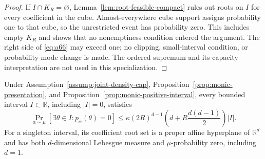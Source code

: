 \begin{proof}
If $I\cap K_R=\varnothing$, Lemma~\ref{lem:root-feasible-compact} rules out
roots on $I$ for every coefficient in the cube.  Almost-everywhere cube
support assigns probability one to that cube, so the unrestricted event has
probability zero.  This includes empty $K_R$ and shows that no nonemptiness
condition entered the argument.  The right side of \eqref{eq:a66} may
exceed one; no clipping, small-interval condition, or probability-mode
change is made.  The ordered supremum and its capacity interpretation are
not used in this specialization.
\end{proof}

\begin{proposition}
\label{prop:complete-monic-baseline}
Under Assumption~\ref{assump:joint-density-cap},
Proposition~\ref{prop:monic-presentation}, and
Proposition~\ref{prop:monic-positive-interval}, every bounded interval
$I\subset\mathbb R$, including $|I|=0$, satisfies
\[
\Pr_{\alpha\sim\mu}\!\left[\exists\theta\in I:p_\alpha(\theta)=0\right]
\leq\kappa(2R)^{d-1}
\left(d+R\frac{d(d-1)}2\right)|I|.
\tag{A68}\label{eq:a68}
\]
For a singleton interval, its coefficient root set is a proper affine
hyperplane of $\mathbb R^d$ and has both $d$-dimensional Lebesgue measure
and $\mu$-probability zero, including $d=1$.
\end{proposition}


